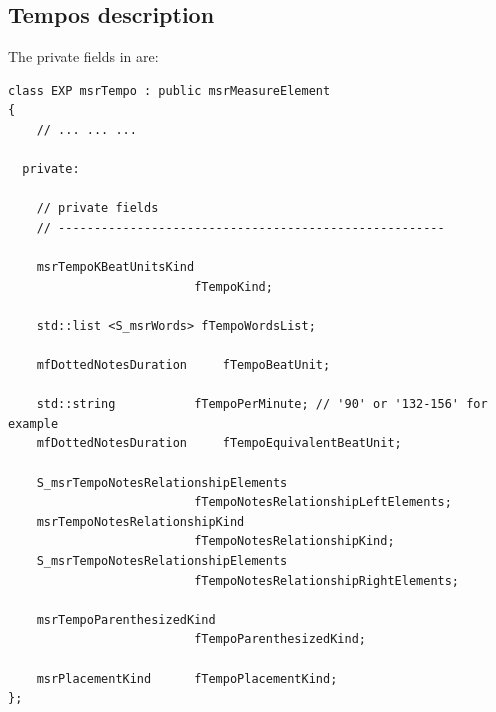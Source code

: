 \subsection{Tempos description}\label{Tempos description}

The private fields in  are:
\begin{lstlisting}[language=CPlusPlus]
class EXP msrTempo : public msrMeasureElement
{
	// ... ... ...

  private:

    // private fields
    // ------------------------------------------------------

    msrTempoKBeatUnitsKind
                          fTempoKind;

    std::list <S_msrWords> fTempoWordsList;

    mfDottedNotesDuration     fTempoBeatUnit;

    std::string           fTempoPerMinute; // '90' or '132-156' for example
    mfDottedNotesDuration     fTempoEquivalentBeatUnit;

    S_msrTempoNotesRelationshipElements
                          fTempoNotesRelationshipLeftElements;
    msrTempoNotesRelationshipKind
                          fTempoNotesRelationshipKind;
    S_msrTempoNotesRelationshipElements
                          fTempoNotesRelationshipRightElements;

    msrTempoParenthesizedKind
                          fTempoParenthesizedKind;

    msrPlacementKind      fTempoPlacementKind;
};
\end{lstlisting}

